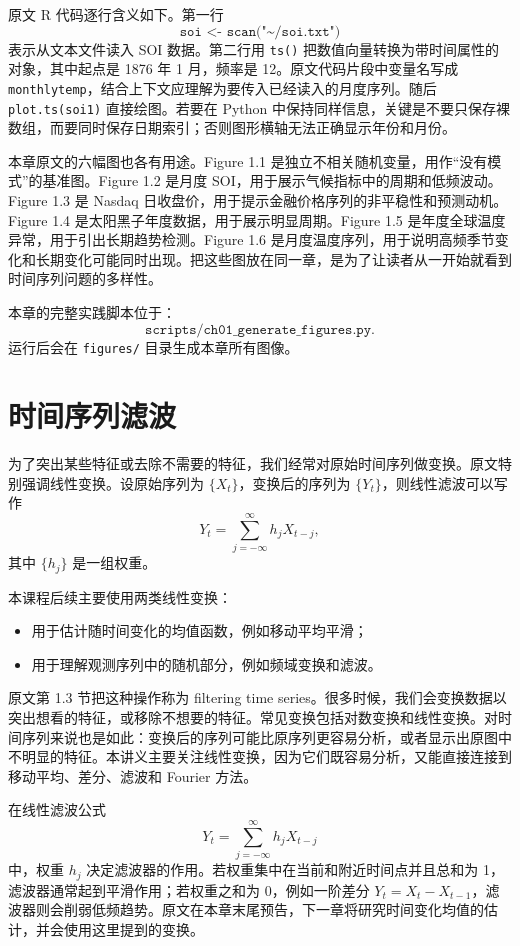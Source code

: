 \documentclass[11pt,a4paper,openany]{ctexbook}
\begin{document}
原文 R 代码逐行含义如下。第一行
\[
  \texttt{soi <- scan("\textasciitilde/soi.txt")}
\]
表示从文本文件读入 SOI 数据。第二行用 \texttt{ts()} 把数值向量转换为带时间属性的对象，其中起点是 1876 年 1 月，频率是 12。原文代码片段中变量名写成 \texttt{monthlytemp}，结合上下文应理解为要传入已经读入的月度序列。随后 \texttt{plot.ts(soi1)} 直接绘图。若要在 Python 中保持同样信息，关键是不要只保存裸数组，而要同时保存日期索引；否则图形横轴无法正确显示年份和月份。

本章原文的六幅图也各有用途。Figure 1.1 是独立不相关随机变量，用作“没有模式”的基准图。Figure 1.2 是月度 SOI，用于展示气候指标中的周期和低频波动。Figure 1.3 是 Nasdaq 日收盘价，用于提示金融价格序列的非平稳性和预测动机。Figure 1.4 是太阳黑子年度数据，用于展示明显周期。Figure 1.5 是年度全球温度异常，用于引出长期趋势检测。Figure 1.6 是月度温度序列，用于说明高频季节变化和长期变化可能同时出现。把这些图放在同一章，是为了让读者从一开始就看到时间序列问题的多样性。

本章的完整实践脚本位于：
\[
  \texttt{scripts/ch01\_generate\_figures.py}.
\]
运行后会在 \texttt{figures/} 目录生成本章所有图像。

\section{时间序列滤波}

为了突出某些特征或去除不需要的特征，我们经常对原始时间序列做变换。原文特别强调线性变换。设原始序列为 \(\{X_t\}\)，变换后的序列为 \(\{Y_t\}\)，则线性滤波可以写作
\[
  Y_t = \sum_{j=-\infty}^{\infty} h_j X_{t-j},
\]
其中 \(\{h_j\}\) 是一组权重。

本课程后续主要使用两类线性变换：
\begin{itemize}
  \item 用于估计随时间变化的均值函数，例如移动平均平滑；
  \item 用于理解观测序列中的随机部分，例如频域变换和滤波。
\end{itemize}

原文第 1.3 节把这种操作称为 filtering time series。很多时候，我们会变换数据以突出想看的特征，或移除不想要的特征。常见变换包括对数变换和线性变换。对时间序列来说也是如此：变换后的序列可能比原序列更容易分析，或者显示出原图中不明显的特征。本讲义主要关注线性变换，因为它们既容易分析，又能直接连接到移动平均、差分、滤波和 Fourier 方法。

在线性滤波公式
\[
  Y_t=\sum_{j=-\infty}^{\infty}h_jX_{t-j}
\]
中，权重 \(h_j\) 决定滤波器的作用。若权重集中在当前和附近时间点并且总和为 1，滤波器通常起到平滑作用；若权重之和为 0，例如一阶差分 \(Y_t=X_t-X_{t-1}\)，滤波器则会削弱低频趋势。原文在本章末尾预告，下一章将研究时间变化均值的估计，并会使用这里提到的变换。
\end{document}
